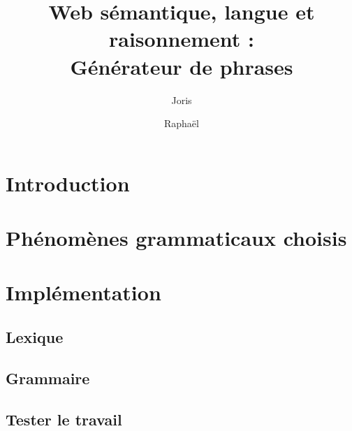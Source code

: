 \documentclass[a4paper,10pt]{article}
\title{
	\textbf{Web sémantique, langue et raisonnement :\\
          Générateur de phrases} }
\author{
	Joris \Nom{Pablo} \and Raphaël \Nom{Gaudy} }
\begin{document}
\maketitle

\section{Introduction}


\section{Phénomènes grammaticaux choisis}


\section{Implémentation}
\subsection{Lexique}

\subsection{Grammaire}

\subsection{Tester le travail}
\end{document}
